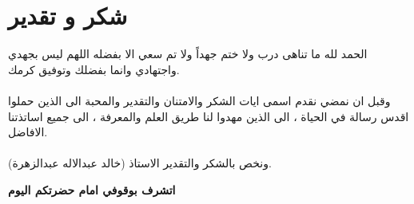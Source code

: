\chapter*{شكر و تقدير}

الحمد لله ما تناهى درب ولا ختم جهداً ولا تم سعي الا بفضله اللهم ليس بجهدي واجتهادي وانما بفضلك وتوفيق كرمك.\\ \\
\noindent
وقبل ان نمضي نقدم اسمى ايات الشكر والامتنان والتقدير والمحبة الى الذين حملوا اقدس رسالة في الحياة ، الى الذين مهدوا لنا طريق العلم والمعرفة ، الى جميع اساتذتنا الافاضل. \\ \\
\noindent
ونخص بالشكر والتقدير الاستاذ (خالد عبدالاله عبدالزهرة).\\
\begin{center}
	\textbf{اتشرف بوقوفي امام حضرتكم اليوم}
\end{center}
